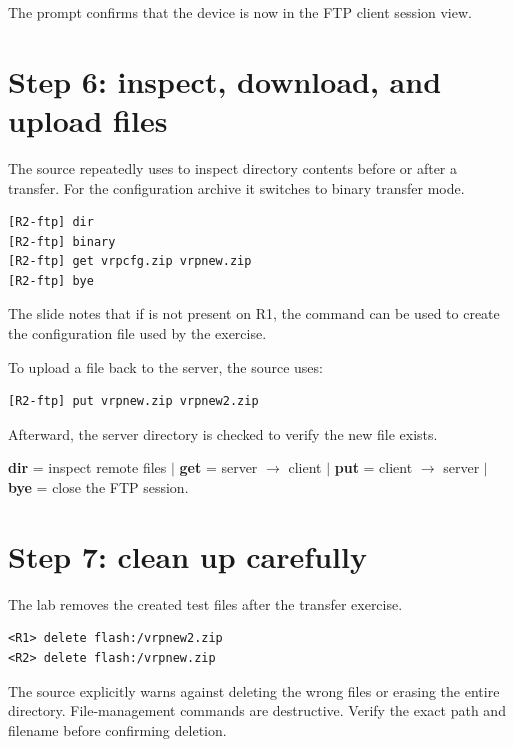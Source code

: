 
The \cmd{[R2-ftp]} prompt confirms that the device is now in the FTP client session view.

\section{Step 6: inspect, download, and upload files}
The source repeatedly uses  to inspect directory contents before or after a transfer. For the configuration archive it switches to binary transfer mode.
\begin{lstlisting}[style=dcnterminal]
[R2-ftp] dir
[R2-ftp] binary
[R2-ftp] get vrpcfg.zip vrpnew.zip
[R2-ftp] bye
\end{lstlisting}
The slide notes that if  is not present on R1, the  command can be used to create the configuration file used by the exercise.

To upload a file back to the server, the source uses:
\begin{lstlisting}[style=dcnterminal]
[R2-ftp] put vrpnew.zip vrpnew2.zip
\end{lstlisting}
Afterward, the server directory is checked to verify the new file exists.

\begin{conceptmap}
\textbf{dir} = inspect remote files \quad $\vert$ \quad
\textbf{get} = server $\rightarrow$ client \quad $\vert$ \quad
\textbf{put} = client $\rightarrow$ server \quad $\vert$ \quad
\textbf{bye} = close the FTP session.
\end{conceptmap}

\section{Step 7: clean up carefully}
The lab removes the created test files after the transfer exercise.
\begin{lstlisting}[style=dcnterminal]
<R1> delete flash:/vrpnew2.zip
<R2> delete flash:/vrpnew.zip
\end{lstlisting}

\begin{pitfall}
The source explicitly warns against deleting the wrong files or erasing the entire  directory. File-management commands are destructive. Verify the exact path and filename before confirming deletion.
\end{pitfall}

